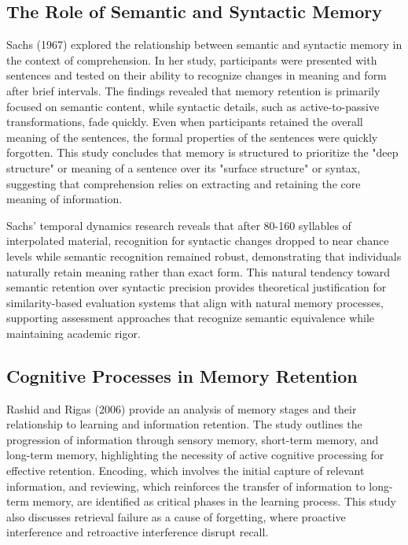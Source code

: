 \subsection{The Role of Semantic and Syntactic Memory}

Sachs (1967) explored the relationship between semantic and syntactic memory in the context of comprehension. In her study, participants were presented with sentences and tested on their ability to recognize changes in meaning and form after brief intervals. The findings revealed that memory retention is primarily focused on semantic content, while syntactic details, such as active-to-passive transformations, fade quickly. Even when participants retained the overall meaning of the sentences, the formal properties of the sentences were quickly forgotten. This study concludes that memory is structured to prioritize the "deep structure" or meaning of a sentence over its "surface structure" or syntax, suggesting that comprehension relies on extracting and retaining the core meaning of information.

{\color{maroon}
Sachs' temporal dynamics research reveals that after 80-160 syllables of interpolated material, recognition for syntactic changes dropped to near chance levels while semantic recognition remained robust, demonstrating that individuals naturally retain meaning rather than exact form. This natural tendency toward semantic retention over syntactic precision provides theoretical justification for similarity-based evaluation systems that align with natural memory processes, supporting assessment approaches that recognize semantic equivalence while maintaining academic rigor.
}

\subsection{Cognitive Processes in Memory Retention}

Rashid and Rigas (2006) provide an analysis of memory stages and their relationship to learning and information retention. The study outlines the progression of information through sensory memory, short-term memory, and long-term memory, highlighting the necessity of active cognitive processing for effective retention. Encoding, which involves the initial capture of relevant information, and reviewing, which reinforces the transfer of information to long-term memory, are identified as critical phases in the learning process. This study also discusses retrieval failure as a cause of forgetting, where proactive interference and retroactive interference disrupt recall. 

